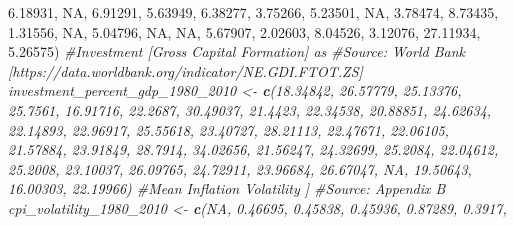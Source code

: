 \documentclass[]{article}
\newenvironment{Shaded}{\begin{snugshade}}{\end{snugshade}}
\newcommand{\CommentTok}[1]{\textcolor[rgb]{0.56,0.35,0.01}{\textit{#1}}}
\newcommand{\DecValTok}[1]{\textcolor[rgb]{0.00,0.00,0.81}{#1}}
\newcommand{\FloatTok}[1]{\textcolor[rgb]{0.00,0.00,0.81}{#1}}
\newcommand{\KeywordTok}[1]{\textcolor[rgb]{0.13,0.29,0.53}{\textbf{#1}}}
\newcommand{\NormalTok}[1]{#1}
\newcommand{\OtherTok}[1]{\textcolor[rgb]{0.56,0.35,0.01}{#1}}
\newcommand{\StringTok}[1]{\textcolor[rgb]{0.31,0.60,0.02}{#1}}
\begin{document}
\begin{Shaded}
\begin{Highlighting}[]
{                           \FloatTok{6.18931}\NormalTok{, }\OtherTok{NA}\NormalTok{, }\FloatTok{6.91291}\NormalTok{, }\FloatTok{5.63949}\NormalTok{, }\FloatTok{6.38277}\NormalTok{, }\FloatTok{3.75266}\NormalTok{,}
                           \FloatTok{5.23501}\NormalTok{, }\OtherTok{NA}\NormalTok{, }\FloatTok{3.78474}\NormalTok{, }\FloatTok{8.73435}\NormalTok{, }\FloatTok{1.31556}\NormalTok{, }\OtherTok{NA}\NormalTok{, }\FloatTok{5.04796}\NormalTok{,}
                           \OtherTok{NA}\NormalTok{, }\OtherTok{NA}\NormalTok{, }\FloatTok{5.67907}\NormalTok{, }\FloatTok{2.02603}\NormalTok{, }\FloatTok{8.04526}\NormalTok{, }\FloatTok{3.12076}\NormalTok{, }\FloatTok{27.11934}\NormalTok{, }\FloatTok{5.26575}\NormalTok{)}
\CommentTok{#Investment [Gross Capital Formation] as % of gdp}
\CommentTok{#Source: World Bank [https://data.worldbank.org/indicator/NE.GDI.FTOT.ZS]}
\NormalTok{investment_percent_gdp_}\DecValTok{1980}\NormalTok{_}\DecValTok{2010}\NormalTok{ <-}\StringTok{ }\KeywordTok{c}\NormalTok{(}\FloatTok{18.34842}\NormalTok{, }\FloatTok{26.57779}\NormalTok{, }\FloatTok{25.13376}\NormalTok{, }\FloatTok{25.7561}\NormalTok{, }
                                      \FloatTok{16.91716}\NormalTok{, }\FloatTok{22.2687}\NormalTok{, }\FloatTok{30.49037}\NormalTok{, }\FloatTok{21.4423}\NormalTok{,}
                                      \FloatTok{22.34538}\NormalTok{, }\FloatTok{20.88851}\NormalTok{, }\FloatTok{24.62634}\NormalTok{, }\FloatTok{22.14893}\NormalTok{,}
                                      \FloatTok{22.96917}\NormalTok{, }\FloatTok{25.55618}\NormalTok{, }\FloatTok{23.40727}\NormalTok{, }\FloatTok{28.21113}\NormalTok{,}
                                      \FloatTok{22.47671}\NormalTok{, }\FloatTok{22.06105}\NormalTok{, }\FloatTok{21.57884}\NormalTok{, }\FloatTok{23.91849}\NormalTok{,}
                                      \FloatTok{28.7914}\NormalTok{, }\FloatTok{34.02656}\NormalTok{, }\FloatTok{21.56247}\NormalTok{, }\FloatTok{24.32699}\NormalTok{,}
                                      \FloatTok{25.2084}\NormalTok{, }\FloatTok{22.04612}\NormalTok{, }\FloatTok{25.2008}\NormalTok{, }\FloatTok{23.10037}\NormalTok{, }
                                      \FloatTok{26.09765}\NormalTok{, }\FloatTok{24.72911}\NormalTok{, }\FloatTok{23.96684}\NormalTok{, }\FloatTok{26.67047}\NormalTok{, }\OtherTok{NA}\NormalTok{, }
                                      \FloatTok{19.50643}\NormalTok{, }\FloatTok{16.00303}\NormalTok{, }\FloatTok{22.19966}\NormalTok{)}
\CommentTok{#Mean Inflation Volatility ]}
\CommentTok{#Source: Appendix B}
\NormalTok{cpi_volatility_}\DecValTok{1980}\NormalTok{_}\DecValTok{2010}\NormalTok{ <-}\StringTok{ }\KeywordTok{c}\NormalTok{(}\OtherTok{NA}\NormalTok{, }\FloatTok{0.46695}\NormalTok{, }\FloatTok{0.45838}\NormalTok{, }\FloatTok{0.45936}\NormalTok{, }\FloatTok{0.87289}\NormalTok{, }\FloatTok{0.3917}\NormalTok{,}
}}
\end{Highlighting}
\end{Shaded}
\end{document}
